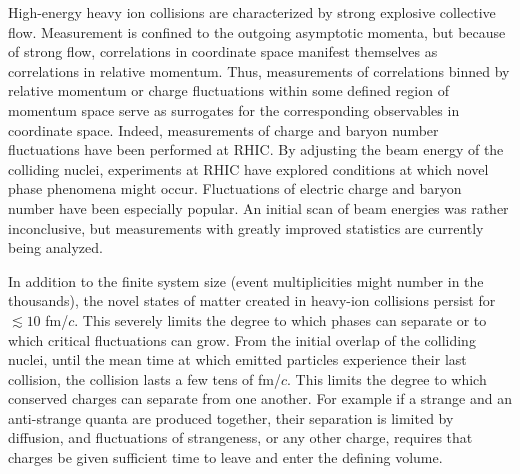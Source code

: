 High-energy heavy ion collisions are characterized by strong explosive collective flow. Measurement is confined to the outgoing asymptotic momenta, but because of strong flow, correlations in coordinate space manifest themselves as correlations in relative momentum. Thus, measurements of correlations binned by relative momentum or charge fluctuations within some defined region of momentum space serve as surrogates for the corresponding observables in coordinate space. Indeed, measurements of charge and baryon number fluctuations have been performed at RHIC. By adjusting the beam energy of the colliding nuclei, experiments at RHIC have explored conditions at which novel phase phenomena might occur. Fluctuations of electric charge and baryon number have been especially popular. An initial scan of beam energies was rather inconclusive, but measurements with greatly improved statistics are currently being analyzed. 

In addition to the finite system size (event multiplicities might number in the thousands), the novel states of matter created in heavy-ion collisions persist for $\lesssim 10$ fm/$c$. This severely limits the degree to which phases can separate or to which critical fluctuations can grow. From the initial overlap of the colliding nuclei, until the mean time at which emitted particles experience their last collision, the collision lasts a few tens of fm/$c$. This limits the degree to which conserved charges can separate from one another. For example if a strange and an anti-strange quanta are produced together, their separation is limited by diffusion, and fluctuations of strangeness, or any other charge, requires that charges be given sufficient time to leave and enter the defining volume.

